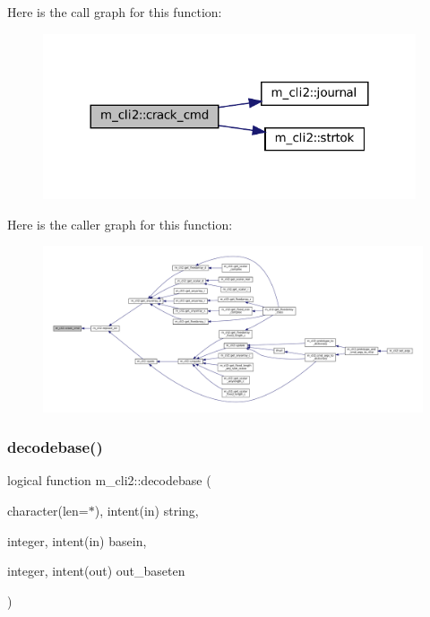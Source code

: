 Here is the call graph for this function\+:
\nopagebreak
\begin{figure}[H]
\begin{center}
\leavevmode
\includegraphics[width=312pt]{namespacem__cli2_a710b26995119aee101959555b1bac8e2_cgraph}
\end{center}
\end{figure}
Here is the caller graph for this function\+:
\nopagebreak
\begin{figure}[H]
\begin{center}
\leavevmode
\includegraphics[width=350pt]{namespacem__cli2_a710b26995119aee101959555b1bac8e2_icgraph}
\end{center}
\end{figure}
\mbox{\label{namespacem__cli2_a1029304d495b2bf791e03cfab5983bbb}} 
\subsubsection{\texorpdfstring{decodebase()}{decodebase()}}
{\footnotesize\ttfamily logical function m\+\_\+cli2\+::decodebase (\begin{DoxyParamCaption}\item[{character(len=$\ast$), intent(in)}]{string,  }\item[{integer, intent(in)}]{basein,  }\item[{integer, intent(out)}]{out\+\_\+baseten }\end{DoxyParamCaption})\hspace{0.3cm}{\ttfamily [private]}}



